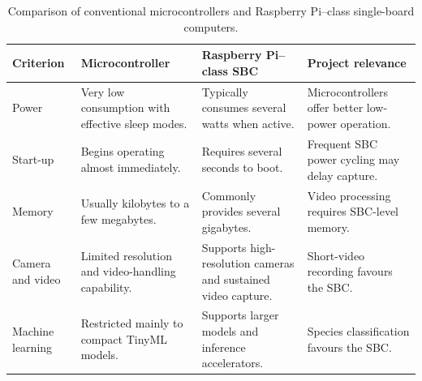\par\vspace{6pt}

\begin{table}[htbp]
    \centering
    \caption{Comparison of conventional microcontrollers and Raspberry Pi--class single-board computers.}
    \label{tab:microcontroller-sbc-comparison}

    \footnotesize
    \setlength{\tabcolsep}{4pt}
    \renewcommand{\arraystretch}{1.2}

    \begin{tabularx}{\textwidth}{
        >{\raggedright\arraybackslash}p{}
        >{\raggedright\arraybackslash}X
        >{\raggedright\arraybackslash}X
        >{\raggedright\arraybackslash}p{}
    }
        \toprule
        \textbf{Criterion}
        & \textbf{Microcontroller}
        & \textbf{Raspberry Pi--class SBC}
        & \textbf{Project relevance} \\
        \midrule

        Power
        & Very low consumption with effective sleep modes.
        & Typically consumes several watts when active.
        & Microcontrollers offer better low-power operation. \\

        \addlinespace

        Start-up
        & Begins operating almost immediately.
        & Requires several seconds to boot.
        & Frequent SBC power cycling may delay capture. \\

        \addlinespace

        Memory
        & Usually kilobytes to a few megabytes.
        & Commonly provides several gigabytes.
        & Video processing requires SBC-level memory. \\

        \addlinespace

        Camera and video
        & Limited resolution and video-handling capability.
        & Supports high-resolution cameras and sustained video capture.
        & Short-video recording favours the SBC. \\

        \addlinespace

        Machine learning
        & Restricted mainly to compact TinyML models.
        & Supports larger models and inference accelerators.
        & Species classification favours the SBC. \\


\end{tabularx}
\end{table}

